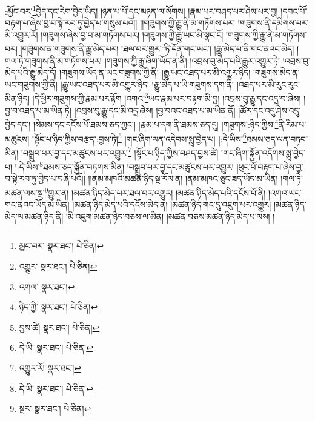 :མྱོང་བར་\footnote{མྱང་བར་  སྣར་ཐང་།  པེ་ཅིན། }བྱེད་དང་རེག་བྱེད་ཡིད། །ཉན་པ་པོ་དང་མཉན་ལ་སོགས། །རྣམ་པར་བཤད་པར་ཤེས་པར་བྱ། །དབང་པོ་བརྟག་པ་ཞེས་བྱ་བ་སྟེ་རབ་ཏུ་བྱེད་པ་གསུམ་པའོ།། །།གཟུགས་ཀྱི་རྒྱུ་ནི་མ་གཏོགས་པར། །གཟུགས་ནི་དམིགས་པར་མི་འགྱུར་རོ། །གཟུགས་ཞེས་བྱ་བ་མ་གཏོགས་པར། །གཟུགས་ཀྱི་རྒྱུ་ཡང་མི་སྣང་ངོ། །གཟུགས་ཀྱི་རྒྱུ་ནི་མ་གཏོགས་པར། །གཟུགས་ན་གཟུགས་ནི་རྒྱུ་མེད་པར། །ཐལ་བར་གྱུར་\footnote{འགྱུར་  སྣར་ཐང་།  པེ་ཅིན། }ཏེ་དོན་གང་ཡང་། །རྒྱུ་མེད་པ་ནི་གང་ནའང་མེད། །གལ་ཏེ་གཟུགས་ནི་མ་གཏོགས་པར། །གཟུགས་ཀྱི་རྒྱུ་ཞིག་ཡོད་ན་ནི། །འབྲས་བུ་མེད་པའི་རྒྱུར་འགྱུར་ཏེ། །འབྲས་བུ་མེད་པའི་རྒྱུ་མེད་དོ། །གཟུགས་ཡོད་ན་ཡང་གཟུགས་ཀྱི་ནི། །རྒྱུ་ཡང་འཐད་པར་མི་འགྱུར་ཉིད། །གཟུགས་མེད་ན་ཡང་གཟུགས་ཀྱི་ནི། །རྒྱུ་ཡང་འཐད་པར་མི་འགྱུར་ཉིད། །རྒྱུ་མེད་པ་ཡི་གཟུགས་དག་ནི། །འཐད་པར་མི་རུང་རུང་མིན་ཉིད། །དེ་ཕྱིར་གཟུགས་ཀྱི་རྣམ་པར་རྟོག །འགའ་\footnote{འགལ་  སྣར་ཐང་། }ཡང་རྣམ་པར་བརྟག་མི་བྱ། །འབྲས་བུ་རྒྱུ་དང་འདྲ་བ་ཞེས། །བྱ་བ་འཐད་པ་མ་ཡིན་ཏེ། །འབྲས་བུ་རྒྱུ་དང་མི་འདྲ་ཞེས། །བྱ་བའང་འཐད་པ་མ་ཡིན་ནོ། །ཚོར་དང་འདུ་ཤེས་འདུ་བྱེད་དང་། །སེམས་དང་དངོས་པོ་ཐམས་ཅད་ཀྱང་། །རྣམ་པ་དག་ནི་ཐམས་ཅད་དུ། །གཟུགས་:ཉིད་ཀྱིས་\footnote{ཉིད་ཀྱི་  སྣར་ཐང་།  པེ་ཅིན། }ནི་རིམ་པ་མཚུངས། །སྟོང་པ་ཉིད་ཀྱིས་བརྩད་:བྱས་ཏེ།\footnote{བྱས་ཚེ།  སྣར་ཐང་།  པེ་ཅིན། } །གང་ཞིག་ལན་འདེབས་སྨྲ་བྱེད་པ། །:དེ་ཡིས་\footnote{དེ་ཡི་  སྣར་ཐང་།  པེ་ཅིན། }ཐམས་ཅད་ལན་བཏབ་མིན། །བསྒྲུབ་པར་བྱ་དང་མཚུངས་པར་འགྱུར།\footnote{འགྱུར་རོ།  སྣར་ཐང་། } །སྟོང་པ་ཉིད་ཀྱིས་བཤད་བྱས་ཚེ། །གང་ཞིག་སྐྱོན་འདོགས་སྨྲ་བྱེད་པ། །:དེ་ཡིས་\footnote{དེ་ཡི་  སྣར་ཐང་།  པེ་ཅིན། }ཐམས་ཅད་སྐྱོན་བཏགས་མིན། །བསྒྲུབ་པར་བྱ་དང་མཚུངས་པར་འགྱུར། །ཕུང་པོ་བརྟག་པ་ཞེས་བྱ་བ་སྟེ་རབ་ཏུ་བྱེད་པ་བཞི་པའོ།། །།ནམ་མཁའི་མཚན་ཉིད་སྔ་རོལ་ན། །ནམ་མཁའ་ཅུང་ཟད་ཡོད་མ་ཡིན། །གལ་ཏེ་མཚན་ལས་སྔ་\footnote{སྔར་  སྣར་ཐང་།  པེ་ཅིན། }གྱུར་ན། །མཚན་ཉིད་མེད་པར་ཐལ་བར་འགྱུར། །མཚན་ཉིད་མེད་པའི་དངོས་པོ་ནི། །འགའ་ཡང་གང་ནའང་ཡོད་མ་ཡིན། །མཚན་ཉིད་མེད་པའི་དངོས་མེད་ན། །མཚན་ཉིད་གང་དུ་འཇུག་པར་འགྱུར། །མཚན་ཉིད་མེད་ལ་མཚན་ཉིད་ནི། །མི་འཇུག་མཚན་ཉིད་བཅས་ལ་མིན། །མཚན་བཅས་མཚན་ཉིད་མེད་པ་ལས། །
